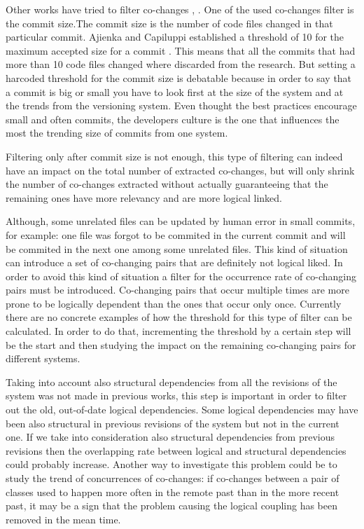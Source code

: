 Other works have tried to filter co-changes \cite{Oliva:2011:ISL:2067853.2068086}, \cite{DBLP:journals/jss/AjienkaC17}. One of the used co-changes filter is the commit size.The commit size is the number of code files changed in that particular commit. 
Ajienka and Capiluppi established a threshold of 10 for the maximum accepted size for a commit \cite{DBLP:journals/jss/AjienkaC17}. This means that all the commits that had more than 10 code files changed where discarded from the research. But setting a harcoded threshold for the commit size is debatable because in order to say that a commit is big or small you have to look first at the size of the system and at the trends from the versioning system. Even thought the best practices encourage small and often commits, the developers culture is the one that influences the most the trending size of commits from one system.

Filtering only after commit size is not enough, this type of filtering can indeed have an impact on the total number of extracted co-changes, but will only shrink the number of co-changes extracted without actually guaranteeing that the remaining ones have more relevancy and are more logical linked.

Although, some unrelated files can be updated by human error in small commits, for example: one file was forgot to be commited in the current commit and will be commited in the next one among some unrelated files. This kind of situation can introduce a set of co-changing pairs that are definitely not logical liked. In order to avoid this kind of situation a filter for the occurrence rate of co-changing pairs must be introduced. Co-changing pairs that occur multiple times are more prone to be logically dependent than the ones that occur only once. Currently there are no concrete examples of how the threshold for this type of filter can be calculated. In order to do that, incrementing the threshold by a certain step will be the start and then studying the impact on the remaining co-changing pairs for different systems. 

Taking into account also structural dependencies from all the revisions of the system was not made in previous works, this step is important in order to filter out the old, out-of-date logical dependencies. Some logical dependencies may have been also structural in previous revisions of the system but not in the current one. If we take into consideration also structural dependencies from previous revisions then the overlapping rate between logical and structural dependencies could probably increase. Another way to investigate this problem could be to study the trend of concurrences of co-changes: if co-changes between a pair of classes used to happen more often in the remote past than in the more recent past, it may be a sign that the problem causing the logical coupling has been removed in the mean time. 

